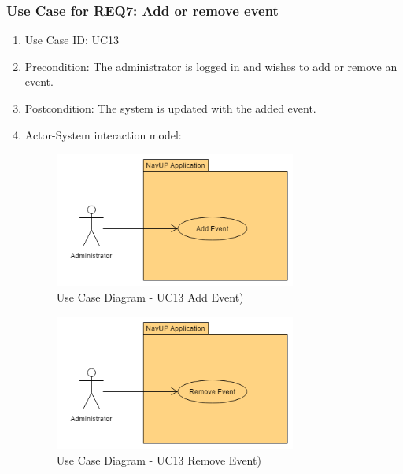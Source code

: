 \documentclass[11pt, a4paper]{article}
\begin{document}
	 
		


		\newpage
		\subsubsection{Use Case for REQ7: Add or remove event}
			\begin{enumerate}
			\renewcommand{\labelenumi}{{\textbf{\arabic{enumi}.}}}
			\item Use Case ID: UC13
			\item Precondition: The administrator is logged in and wishes to add or remove an event.
			\item Postcondition: The system is updated with the added event.
			\item Actor-System interaction model:
				\graphicspath{ {./Images/Administrator/} }
				\begin{figure}[h]
				\caption{Use Case Diagram - UC13 Add Event)}
				\includegraphics[width = 300px]{AddEvent.png}
				\end{figure}
		
				\graphicspath{ {./Images/Administrator/} }
				\begin{figure}[h]
				\caption{Use Case Diagram - UC13 Remove Event)}
				\includegraphics[width = 300px]{RemoveEvent.png}
				\end{figure}
			\end{enumerate}
\end{document}
